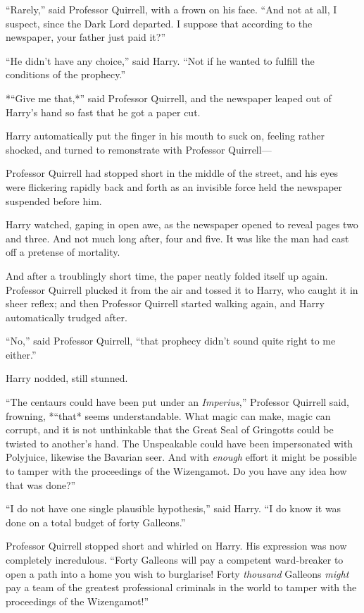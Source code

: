 ``Rarely,'' said Professor Quirrell, with a frown on his face. ``And not
at all, I suspect, since the Dark Lord departed. I suppose that
according to the newspaper, your father just paid it?''

``He didn't have any choice,'' said Harry. ``Not if he wanted to fulfill
the conditions of the prophecy.''

*``Give me that,*'' said Professor Quirrell, and the newspaper leaped
out of Harry's hand so fast that he got a paper cut.

Harry automatically put the finger in his mouth to suck on, feeling
rather shocked, and turned to remonstrate with Professor Quirrell---

Professor Quirrell had stopped short in the middle of the street, and
his eyes were flickering rapidly back and forth as an invisible force
held the newspaper suspended before him.

Harry watched, gaping in open awe, as the newspaper opened to reveal
pages two and three. And not much long after, four and five. It was like
the man had cast off a pretense of mortality.

And after a troublingly short time, the paper neatly folded itself up
again. Professor Quirrell plucked it from the air and tossed it to
Harry, who caught it in sheer reflex; and then Professor Quirrell
started walking again, and Harry automatically trudged after.

``No,'' said Professor Quirrell, ``that prophecy didn't sound quite
right to me either.''

Harry nodded, still stunned.

``The centaurs could have been put under an \emph{Imperius},'' Professor
Quirrell said, frowning, *``that* seems understandable. What magic can
make, magic can corrupt, and it is not unthinkable that the Great Seal
of Gringotts could be twisted to another's hand. The Unspeakable could
have been impersonated with Polyjuice, likewise the Bavarian seer. And
with \emph{enough} effort it might be possible to tamper with the
proceedings of the Wizengamot. Do you have any idea how that was done?''

``I do not have one single plausible hypothesis,'' said Harry. ``I do
know it was done on a total budget of forty Galleons.''

Professor Quirrell stopped short and whirled on Harry. His expression
was now completely incredulous. ``Forty Galleons will pay a competent
ward-breaker to open a path into a home you wish to burglarise! Forty
\emph{thousand} Galleons \emph{might} pay a team of the greatest
professional criminals in the world to tamper with the proceedings of
the Wizengamot!''

